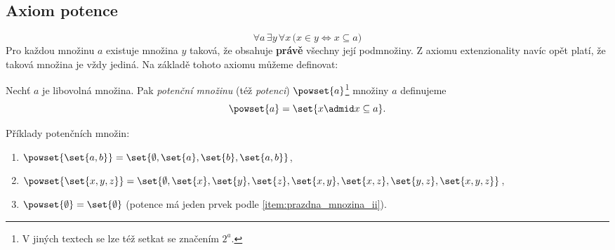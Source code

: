 \subsection{Axiom potence}
\begin{equation*}
    \forall a\,\exists y\,\forall x\,\bigl(x\in y \iff x\subseteq a\bigr)
\end{equation*}
Pro každou množinu $a$ existuje množina $y$ taková, že obsahuje \textbf{právě} všechny její podmnožiny. Z axiomu extenzionality navíc opět platí, že taková množina je vždy jediná. Na základě tohoto axiomu můžeme definovat:
\begin{definition}
    Nechť $a$ je libovolná množina. Pak \emph{potenční množinu} (též \emph{potenci}) $\powset{a}$\footnote{V jiných textech se lze též setkat se značením $2^a$.} množiny $a$ definujeme
    \begin{equation*}
        \powset{a}=\set{x \admid x\subseteq a}.
    \end{equation*}
\end{definition}
\begin{example}\label{ex:potence}
    Příklady potenčních množin:
    \begin{enumerate}[label=(\roman*)]
        \item $\powset{\set{a,b}}=\set{\emptyset,\set{a},\set{b},\set{a,b}}$,
        \item $\powset{\set{x,y,z}}=\set{\emptyset,\set{x},\set{y},\set{z},\set{x,y},\set{x,z},\set{y,z},\set{x,y,z}}$,
        \item $\powset{\emptyset}=\set{\emptyset}$ (potence má jeden prvek podle \ref{item:prazdna_mnozina_ii}). 
    \end{enumerate}
\end{example}

